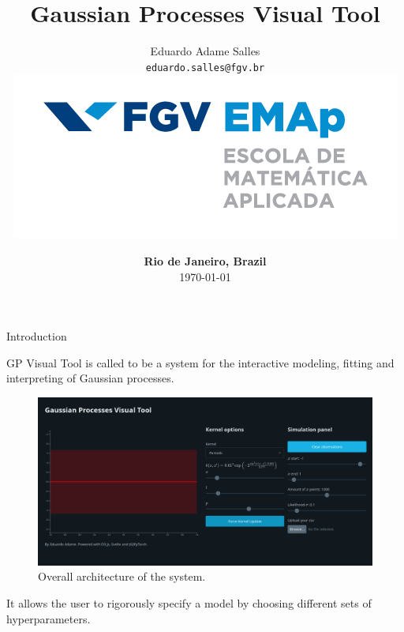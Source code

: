 \documentclass[xcolor=dvipsnames,t,aspectratio=169]{beamer} %
\title{Gaussian Processes Visual Tool} %
\author{Eduardo Adame Salles\\
{\small\texttt{eduardo.salles@fgv.br}}\\
\vspace{0.4cm} \hspace{0.2cm} \includegraphics[scale = 0.25]{emap_logo}}
\date{{\color{fgv_dark_blue}  \textbf{Rio de Janeiro, Brazil}\\ \today}}
\newcommand{\highlight}[1]{{\color{fgv_light_blue} #1}}
\begin{document}
\frame{\titlepage}


\begin{frame}[c]{Introduction}

    \begin{block}{}
    GP Visual Tool is called to be a system for the interactive modeling, fitting and interpreting of \highlight{Gaussian processes}.
    \end{block}\vspace*{1cm}

    \begin{figure}[H]
        \centering
        \includegraphics[height=.4\textheight]{imgs/overall.png}
        \caption{Overall architecture of the system.}
    \end{figure}
    
    It allows the user to \highlight{rigorously} specify \highlight{a model} by choosing different sets of \highlight{hyperparameters}. 

\end{frame}
\end{document}
